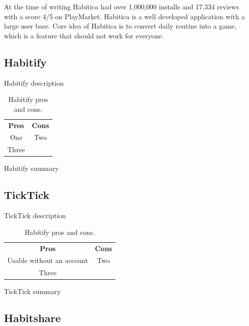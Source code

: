 At the time of writing Habitica had over 1,000,000 installs and 17,334 reviews with a score 4/5 on PlayMarket.
Habitica is a well developed application with a large user base.
Core idea of Habitica is to convert daily routine into a game, which is a feature that should not work for everyone.


\subsection{Habitify}\label{subsec:habitify}

Habitify description

\begin{table}[h!]
    \centering
    \begin{ctucolortab}
        \begin{tabular}{cc}
            \bfseries Pros & \bfseries Cons\\\Midrule
            One & Two\\
            Three & \\
        \end{tabular}
    \end{ctucolortab}
    \caption{Habitify pros and cons.}\label{tab:habitify-pros-cons}
\end{table}

Habitify summary


\subsection{TickTick}\label{subsec:ticktick}

TickTick description

\begin{table}[h!]
    \centering
    \begin{ctucolortab}
        \begin{tabular}{cc}
            \bfseries Pros & \bfseries Cons\\\Midrule
            Usable without an account & Two\\
            Three & \\
        \end{tabular}
    \end{ctucolortab}
    \caption{Habitify pros and cons.}\label{tab:tickTick-pros-cons}
\end{table}

TickTick summary


\subsection{Habitshare}\label{subsec:habitshare}

